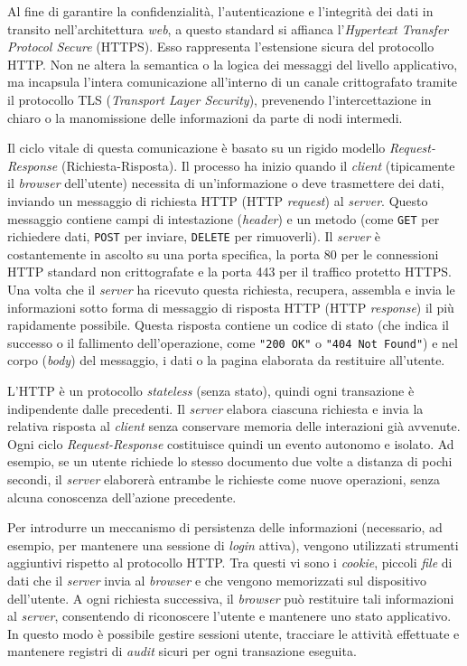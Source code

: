 Al fine di garantire la confidenzialità, l'autenticazione e l'integrità dei dati in transito nell'architettura \textit{web}, a questo standard si affianca l’\textit{Hypertext Transfer Protocol Secure} (HTTPS). Esso rappresenta l'estensione sicura del protocollo HTTP. Non ne altera la semantica o la logica dei messaggi del livello applicativo, ma incapsula l'intera comunicazione all'interno di un canale crittografato tramite il protocollo TLS (\textit{Transport Layer Security}), prevenendo l'intercettazione in chiaro o la manomissione delle informazioni da parte di nodi intermedi. 

Il ciclo vitale di questa comunicazione è basato su un rigido modello \textit{Request-Response} (Richiesta-Risposta). Il processo ha inizio quando il \textit{client} (tipicamente il \textit{browser} dell'utente) necessita di un'informazione o deve trasmettere dei dati, inviando un messaggio di richiesta HTTP (HTTP \textit{request}) al \textit{server}. Questo messaggio contiene campi di intestazione (\textit{header}) e un metodo (come \texttt{GET} per richiedere dati, \texttt{POST} per inviare, \texttt{DELETE} per rimuoverli). Il \textit{server} è costantemente in ascolto su una porta specifica, la porta 80 per le connessioni HTTP standard non crittografate e la porta 443 per il traffico protetto HTTPS. Una volta che il \textit{server} ha ricevuto questa richiesta, recupera, assembla e invia le informazioni sotto forma di messaggio di risposta HTTP (HTTP \textit{response}) il più rapidamente possibile. Questa risposta contiene un codice di stato (che indica il successo o il fallimento dell'operazione, come \texttt{"200 OK"} o \texttt{"404 Not Found"}) e nel corpo (\textit{body}) del messaggio, i dati o la pagina elaborata da restituire all'utente. 

L'HTTP è un protocollo \textit{stateless} (senza stato), quindi ogni transazione è indipendente dalle precedenti. Il \textit{server} elabora ciascuna richiesta e invia la relativa risposta al \textit{client} senza conservare memoria delle interazioni già avvenute. Ogni ciclo \textit{Request-Response} costituisce quindi un evento autonomo e isolato. Ad esempio, se un utente richiede lo stesso documento due volte a distanza di pochi secondi, il \textit{server} elaborerà entrambe le richieste come nuove operazioni, senza alcuna conoscenza dell'azione precedente.

Per introdurre un meccanismo di persistenza delle informazioni (necessario, ad esempio, per mantenere una sessione di \textit{login} attiva), vengono utilizzati strumenti aggiuntivi rispetto al protocollo HTTP. Tra questi vi sono i \textit{cookie}, piccoli \textit{file} di dati che il \textit{server} invia al \textit{browser} e che vengono memorizzati sul dispositivo dell'utente. A ogni richiesta successiva, il \textit{browser} può restituire tali informazioni al \textit{server}, consentendo di riconoscere l'utente e mantenere uno stato applicativo. In questo modo è possibile gestire sessioni utente, tracciare le attività effettuate e mantenere registri di \textit{audit} sicuri per ogni transazione eseguita.

